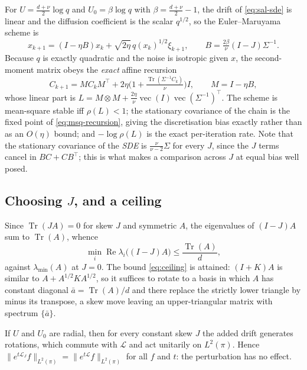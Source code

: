 For $U=\tfrac{d+\nu}{2}\log q$ and $U_0=\beta\log q$ with
$\beta=\tfrac{d+\nu}{2}-1$, the drift of \eqref{eq:sal-sde} is linear and the
diffusion coefficient is the scalar $q^{1/2}$, so the Euler--Maruyama scheme is
\[
  x_{k+1}=(I-\eta B)x_k+\sqrt{2\eta}\,q(x_k)^{1/2}\xi_{k+1},
  \qquad B=\tfrac{2\beta}{\nu}(I-J)\Sigma^{-1}.
\]
Because $q$ is exactly quadratic and the noise is isotropic given $x$, the
second-moment matrix obeys the \emph{exact} affine recursion
\begin{equation}\label{eq:msq-recursion}
  C_{k+1}=MC_kM^\top+2\eta\Big(1+\tfrac{\operatorname{Tr}(\Sigma^{-1}C_k)}{\nu}\Big)I,
  \qquad M=I-\eta B,
\end{equation}
whose linear part is
$L=M\otimes M+\tfrac{2\eta}{\nu}\operatorname{vec}(I)\operatorname{vec}(\Sigma^{-1})^\top$.
The scheme is mean-square stable iff $\rho(L)<1$; the stationary covariance of
the chain is the fixed point of \eqref{eq:msq-recursion}, giving the
discretisation bias exactly rather than as an $O(\eta)$ bound; and
$-\log\rho(L)$ is the exact per-iteration rate.  Note that the stationary
covariance of the \emph{SDE} is $\tfrac{\nu}{\nu-2}\Sigma$ for every $J$, since
the $J$ terms cancel in $BC+CB^\top$; this is what makes a comparison across
$J$ at equal bias well posed.

\subsection{Choosing $J$, and a ceiling}

Since $\operatorname{Tr}(JA)=0$ for skew $J$ and symmetric $A$, the eigenvalues
of $(I-J)A$ sum to $\operatorname{Tr}(A)$, whence
\begin{equation}\label{eq:ceiling}
  \min_i\operatorname{Re}\lambda_i\big((I-J)A\big)\le\frac{\operatorname{Tr}(A)}{d},
\end{equation}
against $\lambda_{\min}(A)$ at $J=0$.  The bound \eqref{eq:ceiling} is attained:
$(I+K)A$ is similar to $A+A^{1/2}KA^{1/2}$, so it suffices to rotate to a basis
in which $A$ has constant diagonal $\bar a=\operatorname{Tr}(A)/d$ and there
replace the strictly lower triangle by minus its transpose, a skew move leaving
an upper-triangular matrix with spectrum $\{\bar a\}$.

\begin{proposition}\label{prop:radial}
If $U$ and $U_0$ are radial, then for every constant skew $J$ the added drift
generates rotations, which commute with $\mathcal L$ and act unitarily on
$L^2(\pi)$.  Hence $\|e^{t\mathcal L_J}f\|_{L^2(\pi)}=\|e^{t\mathcal L}f\|_{L^2(\pi)}$
for all $f$ and $t$: the perturbation has no effect.
\end{proposition}


